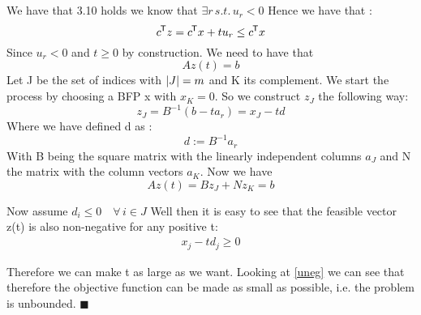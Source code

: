 \documentclass{article}
\DeclarePairedDelimiter{\abs}{\lvert}{\rvert}
\newcommand*{\tran}{^{\mkern-1.5mu\mathsf{T}}}%
\begin{document}
	
	
	
	
	
	\clearpage
	
	\section{}
	
	We have that 3.10 holds we know that $\exists r \, s.t. \, u_r < 0 $ Hence we have that :
	\begin{equation}\label{uneg}
		c\tran z = c\tran x + tu_r \leq c\tran x 
	\end{equation}
	Since $u_r < 0$ and $t \geq 0$ by construction. We need to have that 
	\begin{equation}
		Az(t) = b
	\end{equation}
	Let J be the set of indices with $\abs{J} = m$ and K its complement. We start the process by choosing a BFP x with $x_K = 0$. So we construct $z_J$ the following way:
	\begin{equation}
		z_J = B^{-1}(b- t a_r) = x_J - td
	\end{equation}
	Where we have defined d as :
	\begin{equation}
		d := B^{-1}a_r
	\end{equation}
	With B being the square matrix with the linearly independent columns $a_J$ and N the matrix with the column vectors $a_K$. Now we have
	\begin{equation}
		A z(t) = Bz_J + Nz_K = b
	\end{equation}
	
	Now assume $d_i \leq 0 \quad \forall \, i \in J$
	Well then it is easy to see that the feasible vector z(t) is also non-negative for any positive t:
	\begin{align}
		x_j - td_j \geq 0 
 	\end{align}
	
	Therefore we can make t as large as we want.  Looking at \ref{uneg} we can see that therefore the objective function can be made as small as possible, i.e. the problem is unbounded.
	$\blacksquare$
	
	\clearpage
	
\end{document}
